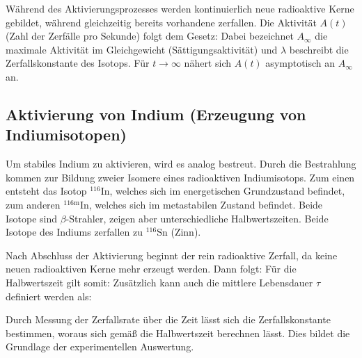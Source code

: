 
Während des Aktivierungsprozesses werden kontinuierlich neue radioaktive Kerne gebildet, während gleichzeitig bereits vorhandene zerfallen. Die Aktivität $A(t)$ (Zahl der Zerfälle pro Sekunde) folgt dem Gesetz:
Dabei bezeichnet $A_{\infty}$ die maximale Aktivität im Gleichgewicht (Sättigungsaktivität) und $\lambda$ beschreibt die Zerfallskonstante des Isotops. Für $t \rightarrow \infty$ nähert sich $A(t)$ asymptotisch an $A_{\infty}$ an.

\subsection{Aktivierung von Indium (Erzeugung von Indiumisotopen)}

Um stabiles Indium zu aktivieren, wird es analog bestreut. Durch die Bestrahlung kommen zur Bildung zweier Isomere eines radioaktiven Indiumisotops. Zum einen entsteht das Isotop $^{116}\mathrm{In}$, welches sich im energetischen Grundzustand befindet, zum anderen $^{116\mathrm{m}}\mathrm{In}$, welches sich im metastabilen Zustand befindet. Beide Isotope sind $\beta$-Strahler, zeigen aber unterschiedliche Halbwertszeiten. Beide Isotope des Indiums zerfallen zu $^{116}\mathrm{Sn}$ (Zinn).

Nach Abschluss der Aktivierung beginnt der rein radioaktive Zerfall, da keine neuen radioaktiven Kerne mehr erzeugt werden. Dann folgt:
Für die Halbwertszeit gilt somit:
Zusätzlich kann auch die mittlere Lebensdauer $\tau$ definiert werden als:

Durch Messung der Zerfallsrate über die Zeit lässt sich die Zerfallskonstante bestimmen, woraus sich gemäß  die Halbwertszeit berechnen lässt. Dies bildet die Grundlage der experimentellen Auswertung.


